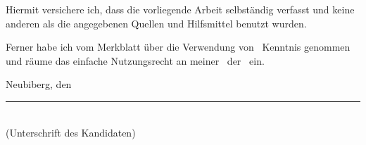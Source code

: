 \begin{declaration}
\noindent Hiermit versichere ich, dass die vorliegende Arbeit selbst\"andig verfasst und keine anderen als die angegebenen Quellen und Hilfsmittel benutzt wurden.

\vspace{1.5cm}
\noindent Ferner habe ich vom Merkblatt \"uber die Verwendung von \tdetype~Kenntnis genommen und r\"aume das einfache Nutzungsrecht an meiner \tdetype~der \univname~ein.

\vspace{1.5cm}
\noindent Neubiberg, den~\hdate

\begin{flushright}
    \rule[0.5em]{20em}{0.5pt}\\
    (Unterschrift des Kandidaten)
\end{flushright}

\vfill
\end{declaration}
